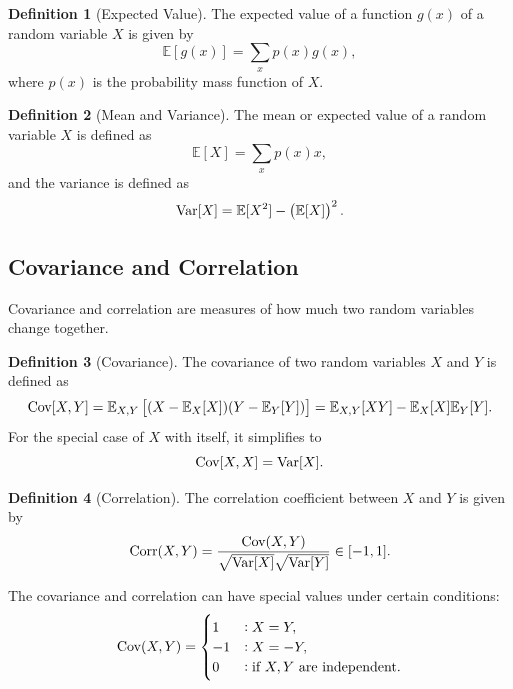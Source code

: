 \documentclass[12pt,openany]{book}
\theoremstyle{definition}
\newtheorem{definition}{Definition}[chapter]
\newcommand{\E}{\mathbb{E}}
\newcommand{\Cov}{\textnormal{Cov}}
\newcommand{\corr}{\textnormal{Corr}}
\newcommand{\Var}{\textnormal{Var}}
\begin{document}
	\begin{definition}[Expected Value]
		The expected value of a function \( g(x) \) of a random variable \( X \) is given by
		\[
		\E[g(x)] = \sum_x p(x) g(x),
		\]
		where \( p(x) \) is the probability mass function of \( X \).
	\end{definition}
	
	\begin{definition}[Mean and Variance]
		The mean or expected value of a random variable \( X \) is defined as
		\[
		\E[X] = \sum_x p(x) x,
		\]
		and the variance is defined as
		\[
		\Var[X] = \E[X^2] - \left(\E[X]\right)^2.
		\]
	\end{definition}
	
	\subsection{Covariance and Correlation}
	Covariance and correlation are measures of how much two random variables change together.
	
	\begin{definition}[Covariance]
		The covariance of two random variables \( X \) and \( Y \) is defined as
		\[
		\Cov[X, Y] = \E_{X,Y}\left[(X - \E_X[X])(Y - \E_Y[Y])\right] = \E_{X,Y}[XY] - \E_X[X]\E_Y[Y].
		\]
		For the special case of \( X \) with itself, it simplifies to
		\[
		\Cov[X, X] = \Var[X].
		\]
	\end{definition}
	
	\begin{definition}[Correlation]
		The correlation coefficient between \( X \) and \( Y \) is given by
		\[
		\corr(X, Y) = \frac{\Cov(X, Y)}{\sqrt{\Var[X]}\sqrt{\Var[Y]}} \in [-1, 1].
		\]
	\end{definition}
	
	The covariance and correlation can have special values under certain conditions:
	\[
	\Cov(X, Y) = 
	\begin{cases}
		1 & : X = Y,\\
		-1 & : X = -Y,\\
		0 & : \text{if \( X, Y \) are independent}.
	\end{cases}
	\]
	
\end{document}
